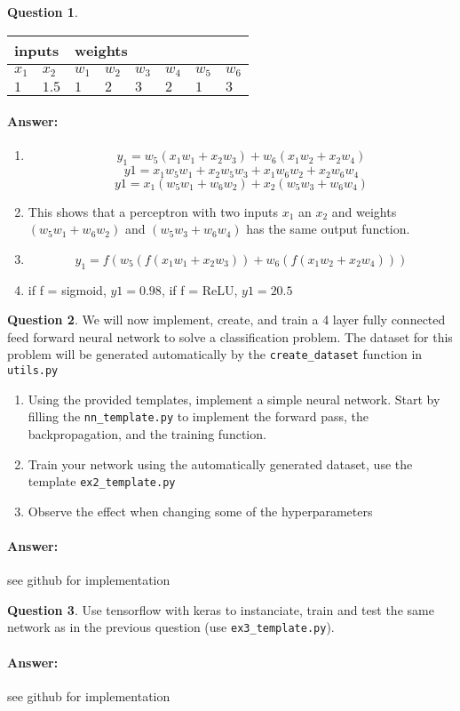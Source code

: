\documentclass[11pt,a4paper]{article}
\theoremstyle{definition}%
\newtheorem{Q}{Question}[] %
\newcommand{\reponse}[1]{%
\ifthenelse {\boolean{corrige}} {\paragraph{Answer:} \color{darkblue}   #1\color{black}} {}
}
\begin{document}
\begin{Q}
\begin{enumerate}
    \begin{center}
    \begin{tabular}{|l|l|l|l|l|l|l|l|}
    \hline
    \multicolumn{2}{|l|}{inputs} & \multicolumn{6}{l|}{weights}                  \\ \hline
    $x_1$         & $x_2$        & $w_1$ & $w_2$ & $w_3$ & $w_4$ & $w_5$ & $w_6$ \\ \hline
    $1$           & $1.5$        & $1$   & $2$   & $3$   & $2$   & $1$   & $3$   \\ \hline
    \end{tabular}
    \end{center}

\end{enumerate}

\reponse{

\begin{enumerate}
    \item $$y_1 = w_5 ( x_1 w_1 + x_2 w_3 ) + w_6 ( x_1 w_2 + x_2 w_4 )$$
        $$y1 = x_1 w_5 w_1 + x_2 w_5 w_3 + x_1 w_6 w_2 + x_2 w_6 w_4$$
        $$y1 = x_1 (w_5 w_1 + w_6 w_2) + x_2 (w_5 w_3 + w_6 w_4)  $$
    \item This shows that a perceptron with two inputs $x_1$ an $x_2$ and weights 
        $(w_5 w_1 + w_6 w_2)$ and $(w_5 w_3 + w_6 w_4)$ has the same output function.
    \item $$y_1 = f(w_5 ( f(x_1 w_1 + x_2 w_3 )) + w_6 ( f(x_1 w_2 + x_2 w_4 )))$$
    \item if f = sigmoid, $y1 = 0.98$, if f = ReLU, $y1 = 20.5$

\end{enumerate}

}

\end{Q}

\begin{Q}
    We will now implement, create, and train a 4 layer fully connected feed forward neural network
    to solve a classification problem.
    The dataset for this problem will be generated automatically by the \verb!create_dataset! function
    in \verb!utils.py!
    \begin{enumerate}
        \item Using the provided templates, implement a simple neural network.
            Start by filling the \verb!nn_template.py! to implement the forward pass,
            the backpropagation, and the training function.
        \item Train your network using the automatically generated dataset, use the template \verb!ex2_template.py!
        \item Observe the effect when changing some of the hyperparameters 
    \end{enumerate}
    \reponse{
        see github for implementation
    }
\end{Q}

\begin{Q}
    Use tensorflow with keras to instanciate, train and test the same network as in the
    previous question (use \verb!ex3_template.py!).

    \reponse{
        see github for implementation
    }
\end{Q}
\end{document}
